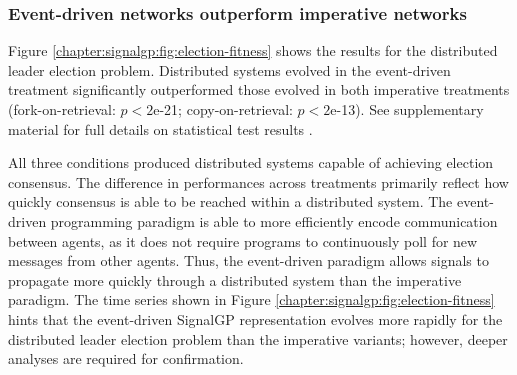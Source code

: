 \subsubsection{Event-driven networks outperform imperative networks}

Figure \ref{chapter:signalgp:fig:election-fitness} shows the results for the distributed leader election problem.
Distributed systems evolved in the event-driven treatment significantly outperformed those evolved in both imperative treatments (fork-on-retrieval: $p<2$e-21; copy-on-retrieval: $p<2$e-13). 
See supplementary material for full details on statistical test results \citep{signalgp_supplement_2018}. 

All three conditions produced distributed systems capable of achieving election consensus. 
The difference in performances across treatments primarily reflect how quickly consensus is able to be reached within a distributed system. 
The event-driven programming paradigm is able to more efficiently encode communication between agents, as it does not require programs to continuously poll for new messages from other agents. 
Thus, the event-driven paradigm allows signals to propagate more quickly through a distributed system than the imperative paradigm. 
The time series shown in Figure \ref{chapter:signalgp:fig:election-fitness} hints that the event-driven SignalGP representation evolves more rapidly for the distributed leader election problem than the imperative variants; however, deeper analyses are required for confirmation. 

